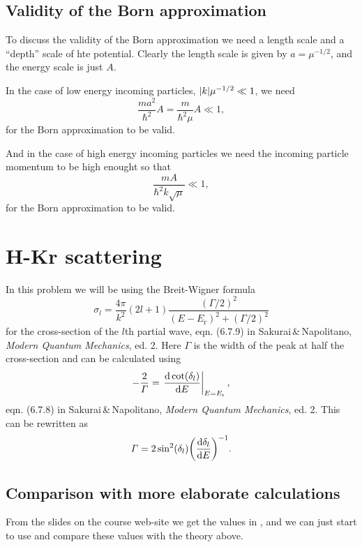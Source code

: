 \documentclass[11pt,letter, swedish, english
]{article}
\begin{document}
\subsection*{Validity of the Born approximation}
To discuss the validity of the Born approximation we need a length
scale and a ``depth'' scale of hte potential. Clearly the length scale
is given by $a=\mu^{-1/2}$, and the energy scale is just $A$.

In the case of low energy incoming particles, $\abs{k}\mu^{-1/2}\ll1$,
we need  
\begin{equation}
\frac{ma^2}{\hbar^2}A=\frac{m}{\hbar^2\mu}A\ll1,
\end{equation}
for the Born approximation to be valid.

And in the case of high energy incoming particles we need the incoming
particle momentum to be high enought so that
\begin{equation}
\frac{mA}{\hbar^2k\sqrt{\mu}}\ll1,
\end{equation}
for the Born approximation to be valid.

\section{H-Kr scattering}
\newcommand{\Er}{E_{\text{r}}}
\newcommand{\BW}{\text{(BW)}}

In this problem we will be using the Breit-Wigner formula
\begin{equation}\label{eq:3_BW}
\sigma_l=
\frac{4\pi}{k^2} (2l+1) \frac{(\varGamma/2)^2}{(E-\Er)^2+(\varGamma/2)^2}
\end{equation}
for the cross-section of the $l$th partial wave, eqn. (6.7.9) in
Sakurai\,\&\,Napolitano, \textit{Modern Quantum Mechanics},
ed. 2. Here $\varGamma$ is the width of the peak at half the
cross-section and can be calculated using
\begin{equation}
-\frac{2}{\varGamma} = \eval{\dv{\cot(\delta_l)}{E}}_{E=\Er},
\end{equation}
eqn. (6.7.8)  in Sakurai\,\&\,Napolitano, 
\textit{Modern Quantum Mechanics}, ed. 2. This can be rewritten as
\begin{equation}\label{eq:3_Gamma}
\varGamma=2\sin^2(\delta_l) \qty(\dv{\delta_l}{E})^{-1}.
\end{equation}


\subsection{Comparison with more elaborate calculations}
From the slides on the course web-site we get the values in
, and we can just start to use and compare these values
with the theory above.
\end{document}
